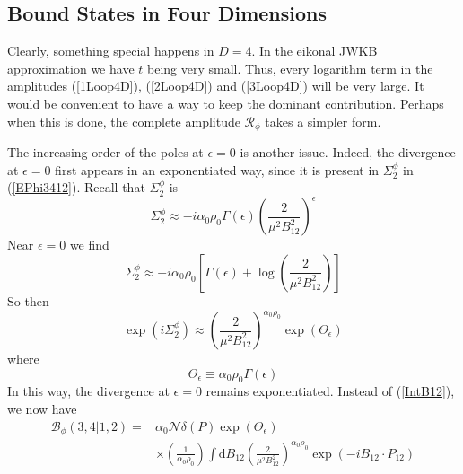 \subsection{Bound States in Four Dimensions\label{BSSca}}
Clearly, something special happens in $D = 4$. In the eikonal JWKB approximation we have $t$ being very small. Thus, every logarithm term in the amplitudes (\ref{1Loop4D}), (\ref{2Loop4D}) and (\ref{3Loop4D}) will be very large. It would be convenient to have a way to keep the dominant contribution. Perhaps when this is done, the complete amplitude $\mathcal{R}_{\phi}$ takes a simpler form.

The increasing order of the poles at $\epsilon = 0$ is another issue. Indeed, the divergence at $\epsilon = 0$ first appears in an exponentiated way, since it is present in $\Sigma_{2}^{\phi}$ in (\ref{EPhi3412}). Recall that $\Sigma_{2}^{\phi}$ is
\begin{equation}
	\Sigma_{2}^{\phi} \approx -i \alpha_{0} \rho_{0} \Gamma(\epsilon) \left( \frac{2}{\mu^{2} B_{12}^{2}} \right)^{\epsilon}
\end{equation}
Near $\epsilon = 0$ we find
\begin{equation}
	\Sigma_{2}^{\phi} \approx -i \alpha_{0} \rho_{0} \left[ \Gamma(\epsilon) + \log{\left( \frac{2}{\mu^{2} B_{12}^{2}} \right)} \right] \label{Sigmaphieps0}
\end{equation}
So then
\begin{equation}
	\exp{(i \Sigma_{2}^{\phi})} \approx \left( \frac{2}{\mu^{2} B_{12}^{2}} \right)^{\alpha_{0} \rho_{0}} \exp{(\Theta_{\epsilon})} \label{ExpSigma2Phi}
\end{equation}
where
\begin{equation}
	\Theta_{\epsilon} \equiv \alpha_{0} \rho_{0} \Gamma(\epsilon)
\end{equation}
In this way, the divergence at $\epsilon = 0$ remains exponentiated. Instead of (\ref{IntB12}), we now have
\begin{equation}
\begin{split}
	\mathcal{B}_{\phi}(3, 4|1,2) = {}& \alpha_{0} \mathcal{N} \delta(P) \exp{(\Theta_{\epsilon})} \\
	&\times \left( \frac{1}{\alpha_{0} \rho_{0}} \right) \int \mathrm{d}B_{12} \left( \frac{2}{\mu^{2} B_{12}^{2}} \right)^{\alpha_{0} \rho_{0}} \exp{\left( - i B_{12} \cdot P_{12} \right)}
\end{split}
\end{equation}
